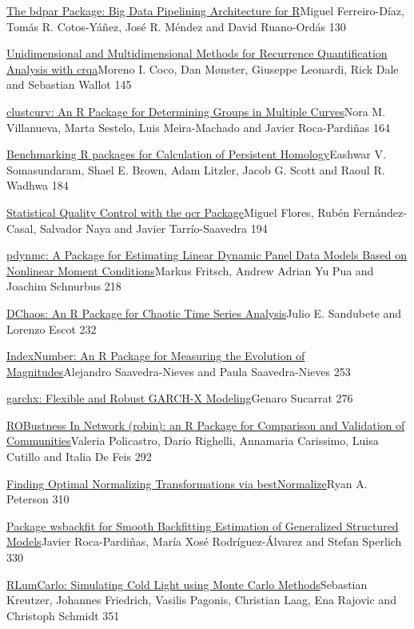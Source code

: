 \href{../../articles/RJ-2021-065}{The bdpar Package: Big Data Pipelining
Architecture for R}Miguel Ferreiro-Díaz, Tomás R. Cotos-Yáñez, José R.
Méndez and David Ruano-Ordás 130

\href{../../articles/RJ-2021-062}{Unidimensional and Multidimensional
Methods for Recurrence Quantification Analysis with crqa}Moreno I. Coco,
Dan Mønster, Giuseppe Leonardi, Rick Dale and Sebastian Wallot 145

\href{../../articles/RJ-2021-032}{clustcurv: An R Package for
Determining Groups in Multiple Curves}Nora M. Villanueva, Marta Sestelo,
Luis Meira-Machado and Javier Roca-Pardiñas 164

\href{../../articles/RJ-2021-033}{Benchmarking R packages for
Calculation of Persistent Homology}Eashwar V. Somasundaram, Shael E.
Brown, Adam Litzler, Jacob G. Scott and Raoul R. Wadhwa 184

\href{../../articles/RJ-2021-034}{Statistical Quality Control with the
qcr Package}Miguel Flores, Rubén Fernández-Casal, Salvador Naya and
Javier Tarrío-Saavedra 194

\href{../../articles/RJ-2021-035}{pdynmc: A Package for Estimating
Linear Dynamic Panel Data Models Based on Nonlinear Moment
Conditions}Markus Fritsch, Andrew Adrian Yu Pua and Joachim Schnurbus
218

\href{../../articles/RJ-2021-036}{DChaos: An R Package for Chaotic Time
Series Analysis}Julio E. Sandubete and Lorenzo Escot 232

\href{../../articles/RJ-2021-038}{IndexNumber: An R Package for
Measuring the Evolution of Magnitudes}Alejandro Saavedra-Nieves and
Paula Saavedra-Nieves 253

\href{../../articles/RJ-2021-057}{garchx: Flexible and Robust GARCH-X
Modeling}Genaro Sucarrat 276

\href{../../articles/RJ-2021-040}{ROBustness In Network (robin): an R
Package for Comparison and Validation of Communities}Valeria Policastro,
Dario Righelli, Annamaria Carissimo, Luisa Cutillo and Italia De Feis
292

\href{../../articles/RJ-2021-041}{Finding Optimal Normalizing
Transformations via bestNormalize}Ryan A. Peterson 310

\href{../../articles/RJ-2021-042}{Package wsbackfit for Smooth
Backfitting Estimation of Generalized Structured Models}Javier
Roca-Pardiñas, María Xosé Rodríguez-Álvarez and Stefan Sperlich 330

\href{../../articles/RJ-2021-043}{RLumCarlo: Simulating Cold Light using
Monte Carlo Methods}Sebastian Kreutzer, Johannes Friedrich, Vasilis
Pagonis, Christian Laag, Ena Rajovic and Christoph Schmidt 351

